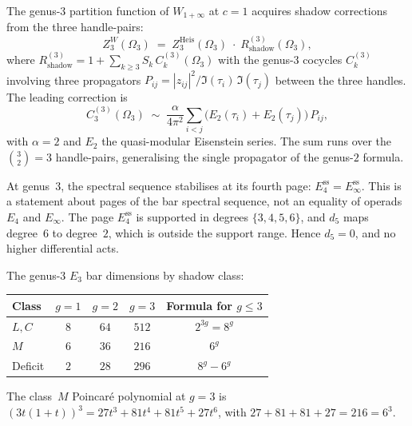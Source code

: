 \begin{conjecture}
\label{conj:genus3-w1inf}
\ClaimStatusConjectured
The genus-$3$ partition function of $W_{1+\infty}$ at $c = 1$ acquires
shadow corrections from the three handle-pairs:
\[
 Z_3^{W}(\Omega_3)
 \;=\;
 Z_3^{\mathrm{Heis}}(\Omega_3)
 \;\cdot\;
 R_{\mathrm{shadow}}^{(3)}(\Omega_3),
\]
where $R_{\mathrm{shadow}}^{(3)} = 1 + \sum_{k \geq 3} S_k\, C_k^{(3)}(\Omega_3)$
with the genus-$3$ cocycles $C_k^{(3)}$ involving three propagators
$P_{ij} = |z_{ij}|^2 / \Im(\tau_i)\,\Im(\tau_j)$ between the three handles.
The leading correction is
\[
 C_3^{(3)}(\Omega_3)
 \;\sim\;
 \frac{\alpha}{4\pi^2}
 \sum_{i < j}\bigl(E_2(\tau_i) + E_2(\tau_j)\bigr)\, P_{ij},
\]
with $\alpha = 2$ and $E_2$ the quasi-modular Eisenstein series.
The sum runs over the $\binom{3}{2} = 3$ handle-pairs, generalising the
single propagator of the genus-$2$ formula.
\end{conjecture}

\begin{remark}
\label{rem:e3-bar-genus3}
At genus~$3$, the spectral sequence stabilises at its fourth page:
$E^{\mathrm{ss}}_4 = E^{\mathrm{ss}}_\infty$. This is a statement about
pages of the bar spectral sequence, not an equality of operads
$E_4$ and $E_\infty$. The page $E^{\mathrm{ss}}_4$ is supported in
degrees $\{3, 4, 5, 6\}$, and $d_5$ maps degree~$6$ to degree~$2$,
which is outside the support range. Hence $d_5 = 0$, and no higher
differential acts.

The genus-$3$ $E_3$ bar dimensions by shadow class:
\begin{center}
\renewcommand{\arraystretch}{1.2}
\begin{tabular}{lcccc}
 \toprule
 Class & $g = 1$ & $g = 2$ & $g = 3$ & Formula for \(g\leq3\) \\
 \midrule
 $L, C$ & $8$ & $64$ & $512$ & $2^{3g} = 8^g$ \\
 $M$ & $6$ & $36$ & $216$ & $6^g$ \\
 Deficit & $2$ & $28$ & $296$ & $8^g - 6^g$ \\
 \bottomrule
\end{tabular}
\end{center}
The class~$M$ Poincar\'e polynomial at $g = 3$ is
$(3t(1+t))^3 = 27 t^3 + 81 t^4 + 81 t^5 + 27 t^6$,
with $27 + 81 + 81 + 27 = 216 = 6^3$.
\end{remark}

